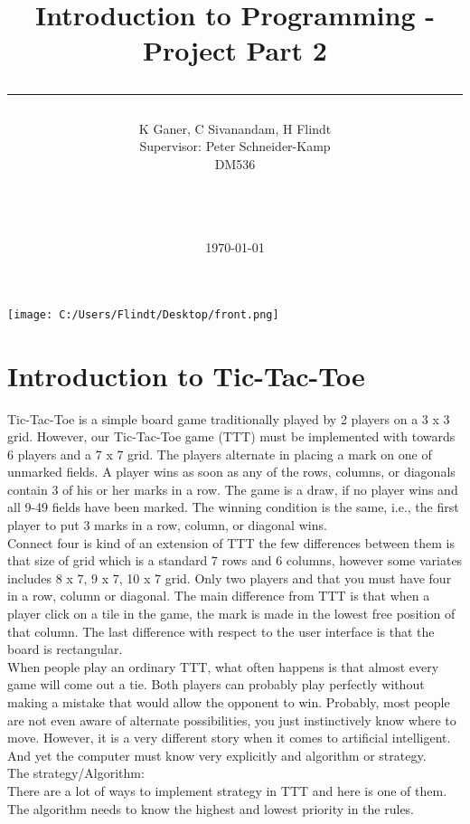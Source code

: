 \documentclass[a4paper,10pt]{article}
\title{Introduction to Programming - Project Part 2 \\\rule{10cm}{0.5mm}}
\author{K Ganer, C Sivanandam, H Flindt 
	\\Supervisor: Peter Schneider-Kamp\\ DM536\\\rule{5.5cm}{0.5mm}\\}
\date{\today}
\begin{document}
	
	\maketitle
	\vspace{20mm}
	
	\centerline{\texttt{[image: C:/Users/Flindt/Desktop/front.png]}}
	
	
	\newpage
	\tableofcontents
	
	\newpage
	
	\section{Introduction to Tic-Tac-Toe}
	Tic-Tac-Toe is a simple board game traditionally played by 2 players on a 3 x 3 grid. However, our Tic-Tac-Toe game (TTT) must be implemented with towards 6 players and a 7 x 7 grid. The players alternate in placing a mark on one of unmarked fields. A player wins as soon as any of the rows, columns, or diagonals contain 3 of his or her marks in a row. The game is a draw, if no player wins and all 9-49 fields have been marked. The winning condition is the same, i.e., the first player to put 3 marks in a row, column, or diagonal wins.\\ 
	Connect four is kind of an extension of TTT the few differences between them is that size of grid which is a  standard 7 rows and 6 columns, however some variates includes 8 x 7, 9 x 7, 10 x 7 grid. Only two players and that you must have four in a row, column or diagonal. The main difference from TTT is that when a player click on a tile in the game, the mark is made in the lowest free position of that column. The last difference with respect to the user interface is that the board is rectangular.\\
	When people play an ordinary TTT, what often happens is that almost every game will come out a tie. Both players can probably play perfectly without making a mistake that would allow the opponent to win. Probably, most people are not even aware of alternate possibilities, you just instinctively know where to move. However, it is a very different story when it comes to artificial intelligent. And yet the computer must know very explicitly and algorithm or strategy.\\
	The strategy/Algorithm:\\
	There are a lot of ways to implement strategy in TTT and here is one of them. The algorithm needs to know the highest and lowest priority in the rules.\\ 
\end{document}
